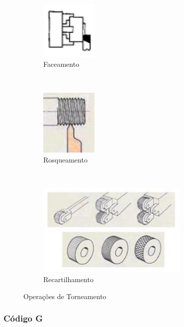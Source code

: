 \documentclass[a4paper,11pt]{article}
\begin{document}
\begin{figure}[H]
    \begin{subfigure}[b]{0.3\textwidth}
        \centering
        \includegraphics[width= 0.3\textwidth]{img/relat1/optornoFac}
        \caption{Faceamento}
    \end{subfigure}
    ~
    \begin{subfigure}[b]{0.3\textwidth}
        \centering
        \includegraphics[width= 0.3\textwidth]{img/relat1/optornoRosq}
        \caption{Rosqueamento}
    \end{subfigure}
    ~
    \begin{subfigure}[t]{0.3\textwidth}
        \centering
        \includegraphics[width= 0.8\textwidth]{img/relat1/optornoReq}
        \caption{Recartilhamento}
    \end{subfigure}
    \caption{Operações de Torneamento}
\end{figure}


\subsubsection{Código G}
\end{document}
